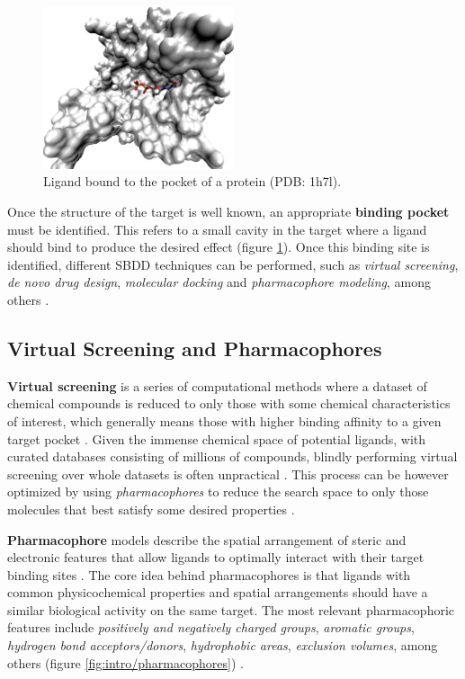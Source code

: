     \begin{figure}[H]
      \centering
      \includegraphics[width=0.5\textwidth]{figures/intro/pocket.png}
      \caption{\label{fig:intro/pocket} Ligand bound to the pocket of a protein (PDB: 1h7l).}
    \end{figure}

    Once the structure of the target is well known, an appropriate \textbf{binding pocket} must be identified. This refers to a small cavity in the target where a ligand should bind to produce the desired effect (figure \ref{fig:intro/pocket}). Once this binding site is identified, different SBDD techniques can be performed, such as \textit{virtual screening}, \textit{de novo drug design}, \textit{molecular docking} and \textit{pharmacophore modeling}, among others \cite{drug_discovery_2014, structure_based_2019, pharmacophore_and_VS_2022}.

  \subsection{Virtual Screening and Pharmacophores}
    \textbf{Virtual screening} is a series of computational methods where a dataset of chemical compounds is reduced to only those with some chemical characteristics of interest, which generally means those with higher binding affinity to a given target pocket \cite{pharmacophore_and_VS_2022, virtual_screening_2019}. Given the immense chemical space of potential ligands, with curated databases consisting of millions of compounds, blindly performing virtual screening over whole datasets is often unpractical \cite{virtual_screening_2013}. This process can be however optimized by using \textit{pharmacophores} to reduce the search space to only those molecules that best satisfy some desired properties \cite{pharmacophore_and_VS_2022}.

    \textbf{Pharmacophore} models describe the spatial arrangement of steric and electronic features that allow ligands to optimally interact with their target binding sites \cite{pharmacophore_and_VS_2022, virtual_screening_2019, pharmacophore_modeling_2022, drug_discovery_2014}. The core idea behind pharmacophores is that ligands with common physicochemical properties and spatial arrangements should have a similar biological activity on the same target. The most relevant pharmacophoric features include \textit{positively and negatively charged groups}, \textit{aromatic groups}, \textit{hydrogen bond acceptors/donors}, \textit{hydrophobic areas}, \textit{exclusion volumes}, among others (figure \ref{fig:intro/pharmacophores}) \cite{pharmacophore_and_VS_2022, drug_discovery_2014}.

